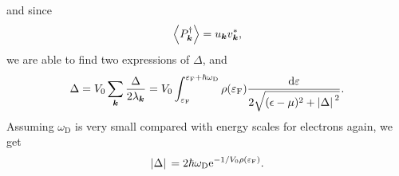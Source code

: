 \documentclass[hyperref, a4paper]{article}
\newcommand*{\ee}{\mathrm{e}}
\begin{document}
and since 
\begin{equation}
    \expval{P^\dagger_{\vb*{k}}} = u_{\vb*{k}} v^*_{\vb*{k}},
\end{equation}
we are able to find two expressions of $\Delta$, and 
\begin{equation}
    \Delta = V_0 \sum_{\vb*{k}} \frac{\Delta}{2 \lambda_{\vb*{k}}}
    = V_0 \int_{\varepsilon_{\text{F}}}^{\varepsilon_{\text{F}} + \hbar \omega_{\text{D}}} 
    \rho(\varepsilon_{\text{F}}) \frac{\dd{\varepsilon}}{2 \sqrt{(\epsilon - \mu)^2 + \abs*{\Delta}^2} }.
\end{equation}
Assuming $\omega_{\text{D}}$ is very small compared with 
energy scales for electrons again, 
we get 
\begin{equation}
    \abs*{\Delta} = 2 \hbar \omega_{\text{D}} \ee^{- 1 / V_0 \rho(\varepsilon_{\text{F}})}.
\end{equation}
\end{document}
